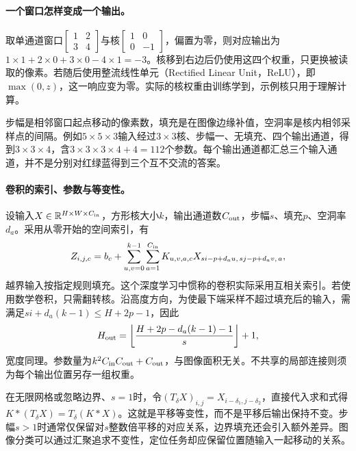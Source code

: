 \paragraph{一个窗口怎样变成一个输出。}
取单通道窗口$\left[\begin{smallmatrix}1&2\\3&4\end{smallmatrix}\right]$与核$\left[\begin{smallmatrix}1&0\\0&-1\end{smallmatrix}\right]$，偏置为零，则对应输出为$1\times1+2\times0+3\times0-4\times1=-3$。核移到右边后仍使用这四个权重，只更换被读取的像素。若随后使用整流线性单元（Rectified Linear Unit，ReLU），即$\max(0,z)$，这一响应变为零。实际的核权重由训练学到，示例核只用于理解计算。

步幅是相邻窗口起点移动的像素数，填充是在图像边缘补值，空洞率是核内相邻采样点的间隔。例如$5\times5\times3$输入经过$3\times3$核、步幅一、无填充、四个输出通道，得到$3\times3\times4$，含$3\times3\times3\times4+4=112$个参数。每个输出通道都汇总三个输入通道，并不是分别对红绿蓝得到三个互不交流的答案。

\paragraph{卷积的索引、参数与等变性。}
设输入$X\in\mathbb{R}^{H\times W\times C_{\rm in}}$，方形核大小$k$，输出通道数$C_{\rm out}$，步幅$s$、填充$p$、空洞率$d_a$。采用从零开始的空间索引，有
\begin{equation}
 Z_{i,j,c}=b_c+\sum_{u,v=0}^{k-1}\sum_{a=1}^{C_{\rm in}}
 K_{u,v,a,c}X_{si-p+d_au,\,sj-p+d_av,\,a},
\end{equation}
越界输入按指定规则填充。这个深度学习中惯称的卷积实际采用互相关索引。若使用数学卷积，只需翻转核。沿高度方向，为使最下端采样不超过填充后的输入，需满足$s i+d_a(k-1)\leq H+2p-1$，因此
\begin{equation}
 H_{\rm out}=\left\lfloor\frac{H+2p-d_a(k-1)-1}{s}\right\rfloor+1,
\end{equation}
宽度同理。参数量为$k^2C_{\rm in}C_{\rm out}+C_{\rm out}$，与图像面积无关。不共享的局部连接则须为每个输出位置另存一组权重。

在无限网格或忽略边界、$s=1$时，令$(T_\delta X)_{i,j}=X_{i-\delta_1,j-\delta_2}$，直接代入求和式得$K*(T_\delta X)=T_\delta(K*X)$。这就是平移等变性，而不是平移后输出保持不变。步幅$s>1$时通常仅保留对$s$整数倍平移的对应关系，边界填充还会引入额外差异。图像分类可以通过汇聚追求不变性，定位任务却应保留位置随输入一起移动的关系。

